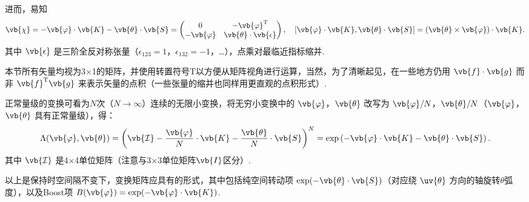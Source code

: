 进而，易知
\begin{align*}
	\vb{\chi} = -\vb{\varphi} \cdot \vb{K} - \vb{\theta} \cdot \vb{S} = \begin{pmatrix}
		0             & -\vb{\varphi}^\mathrm{T}        \\
		-\vb{\varphi} & \vb{\theta} \cdot \vb{\epsilon}
	\end{pmatrix}, \quad
	[\vb{\varphi} \cdot \vb{K}, \vb{\theta} \cdot \vb{S}] = (\vb{\theta} \times \vb{\varphi}) \cdot \vb{K}.
\end{align*}
其中 \(\vb{\epsilon}\) 是三阶全反对称张量（\(\epsilon_{123} = 1\)，\(\epsilon_{132} = -1\)，…），点乘对最临近指标缩并.
\begin{note}
	本节所有矢量均视为3×1的矩阵，并使用转置符号\(\mathrm{T}\)以方便从矩阵视角进行运算，当然，为了清晰起见，在一些地方仍用 \(\vb{f} \cdot \vb{g}\) 而非 \(\vb{f}^\mathrm{T} \vb{g}\) 来表示矢量的点积（一些张量的缩并也同样用更直观的点积形式）.
\end{note}

正常量级的变换可看为\(N\)次（\(N \to \infty\)）连续的无限小变换，将无穷小变换中的 \(\vb{\varphi}\)，\(\vb{\theta}\) 改写为 \(\vb{\varphi}/N\)，\(\vb{\theta}/N\)（\(\vb{\varphi}\)，\(\vb{\theta}\) 具有正常量级），得：
\begin{align*}
	\Lambda(\vb{\varphi}, \vb{\theta}) = \left( \vb{\mathcal{I}} - \dfrac{\vb{\varphi}}{N} \cdot \vb{K} - \dfrac{\vb{\theta}}{N} \cdot \vb{S} \right)^N = \exp\left( -\vb{\varphi} \cdot \vb{K} - \vb{\theta} \cdot \vb{S} \right).
\end{align*}
其中 \(\vb{\mathcal{I}}\) 是4×4单位矩阵（注意与3×3单位矩阵\(\vb{I}\)区分）.

以上是保持时空间隔不变下，变换矩阵应具有的形式，其中包括纯空间转动项 \(\exp(-\vb{\theta} \cdot \vb{S})\)（对应绕 \(\uv{\theta}\) 方向的轴旋转\(\theta\)弧度），以及Boost项 \(B(\vb{\varphi}) = \exp(-\vb{\varphi} \cdot \vb{K})\).

